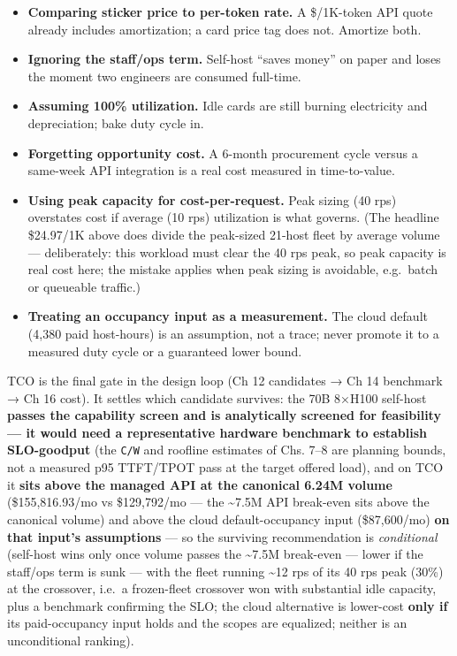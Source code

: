 \begin{itemize}
\tightlist
\item
  \textbf{Comparing sticker price to per-token rate.} A \$/1K-token API
  quote already includes amortization; a card price tag does not.
  Amortize both.
\item
  \textbf{Ignoring the staff/ops term.} Self-host ``saves money'' on
  paper and loses the moment two engineers are consumed full-time.
\item
  \textbf{Assuming 100\% utilization.} Idle cards are still burning
  electricity and depreciation; bake duty cycle in.
\item
  \textbf{Forgetting opportunity cost.} A 6-month procurement cycle
  versus a same-week API integration is a real cost measured in
  time-to-value.
\item
  \textbf{Using peak capacity for cost-per-request.} Peak sizing (40
  rps) overstates cost if average (10 rps) utilization is what governs.
  (The headline \$24.97/1K above does divide the peak-sized 21-host
  fleet by average volume --- deliberately: this workload must clear the
  40 rps peak, so peak capacity is real cost here; the mistake applies
  when peak sizing is avoidable, e.g.~batch or queueable traffic.)
\item
  \textbf{Treating an occupancy input as a measurement.} The cloud
  default (4,380 paid host-hours) is an assumption, not a trace; never
  promote it to a measured duty cycle or a guaranteed lower bound.
\end{itemize}

\label{architecture-consequence}


TCO is the final gate in the design loop (Ch 12 candidates → Ch 14
benchmark → Ch 16 cost). It settles which candidate survives: the 70B
8×H100 self-host \textbf{passes the capability screen and is
analytically screened for feasibility --- it would need a representative
hardware benchmark to establish SLO-goodput} (the \texttt{C/W} and
roofline estimates of Chs. 7--8 are planning bounds, not a measured p95
TTFT/TPOT pass at the target offered load), and on TCO it \textbf{sits
above the managed API at the canonical 6.24M volume} (\$155,816.93/mo vs
\$129,792/mo --- the \textasciitilde7.5M API break-even sits above the
canonical volume) and above the cloud default-occupancy input
(\$87,600/mo) \textbf{on that input's assumptions} --- so the surviving
recommendation is \emph{conditional} (self-host wins only once volume
passes the \textasciitilde7.5M break-even --- lower if the staff/ops
term is sunk --- with the fleet running \textasciitilde12 rps of its 40
rps peak (30\%) at the crossover, i.e.~a frozen-fleet crossover won with
substantial idle capacity, plus a benchmark confirming the SLO; the
cloud alternative is lower-cost \textbf{only if} its paid-occupancy
input holds and the scopes are equalized; neither is an unconditional
ranking).

